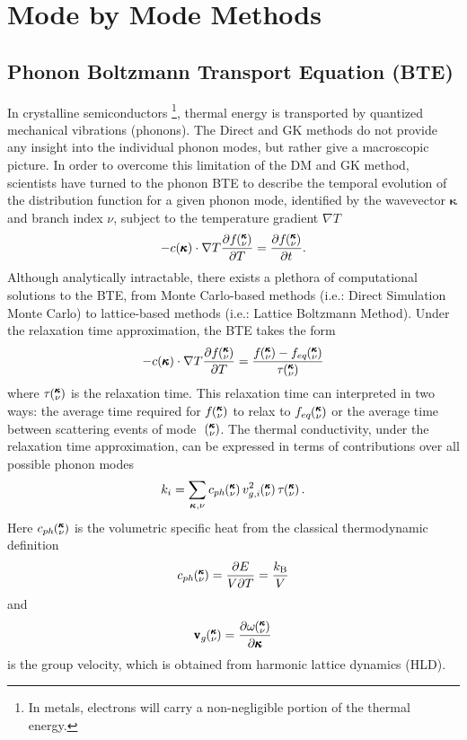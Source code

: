 \section{Mode by Mode Methods}
\subsection{Phonon Boltzmann Transport Equation (BTE)}
%
In crystalline semiconductors \footnote{In metals, electrons will carry a non-negligible portion of the thermal energy.}, thermal energy is transported by quantized mechanical vibrations (phonons). The Direct and GK methods do not provide any insight into the individual phonon modes, but rather give a macroscopic picture. In order to overcome this limitation of the DM and GK method, scientists have turned to the phonon BTE to describe the temporal evolution of the distribution function for a given phonon mode, identified by the wavevector $\pmb{\kappa}$ and branch index $\nu$, subject to the temperature gradient $\nabla T$ \cite{srivastava1990physics} 
%
\begin{equation}\label{EQ:BTE}
-c(\pmb{\kappa})\cdot \nabla T\frac{\partial f\mspace{-4.0mu}\left(\mspace{-8.0mu} \begin{smallmatrix}&\pmb{\kappa} \\&\nu\end{smallmatrix} \mspace{-3.0mu}\right)}{\partial T}=\frac{\partial f\mspace{-4.0mu}\left(\mspace{-8.0mu} \begin{smallmatrix}&\pmb{\kappa} \\&\nu\end{smallmatrix} \mspace{-3.0mu}\right)}{\partial t}.
\end{equation}
%
Although analytically intractable, there exists a plethora of computational solutions to the BTE, from Monte Carlo-based methods (i.e.: Direct Simulation Monte Carlo)\cite{mazumder2001monte} to lattice-based methods (i.e.: Lattice Boltzmann Method)\cite{nabovati2011lattice}. Under the relaxation time approximation, the BTE takes the form
%
\begin{equation}\label{EQ:BTE_lin}
-c(\pmb{\kappa})\cdot \nabla T\frac{\partial f\kv}{\partial T}=\frac{f\kv-f_{eq}\kv}{\tau \kv}
\end{equation}
%
where $\tau \mspace{-4.0mu}\left(\mspace{-8.0mu} \begin{smallmatrix}&\pmb{\kappa} \\&\nu\end{smallmatrix} \mspace{-3.0mu}\right)$ is the relaxation time. This relaxation time can interpreted in two ways: the average time required for $f\mspace{-4.0mu}\left(\mspace{-8.0mu} \begin{smallmatrix}&\pmb{\kappa} \\&\nu\end{smallmatrix} \mspace{-3.0mu}\right)$ to relax to $f_{eq}\mspace{-4.0mu}\left(\mspace{-8.0mu} \begin{smallmatrix}&\pmb{\kappa} \\&\nu\end{smallmatrix} \mspace{-3.0mu}\right)$ or the average time between scattering events of mode ~$\mspace{-4.0mu}\left(\mspace{-8.0mu} \begin{smallmatrix}&\pmb{\kappa} \\&\nu\end{smallmatrix} \mspace{-3.0mu}\right)$. The thermal conductivity, under the relaxation time approximation, can be expressed in terms of contributions over all possible phonon modes \cite{srivastava1990physics}
%
\begin{equation}\label{EQ:k_RTA}
	k_{i}= \sum_{\bm{\kappa},\nu} c_{ph}\kv v^2_{g,i}\kv\tau\kv.
\end{equation}
%
Here $c_{ph}\mspace{-4.0mu}\left(\mspace{-8.0mu} \begin{smallmatrix}&\pmb{\kappa} \\&\nu\end{smallmatrix} \mspace{-3.0mu}\right)$ is the volumetric specific heat from the classical thermodynamic definition \cite{mcgaugheythesis}
%
\begin{equation}\label{EQ:Cph}
c_{ph}\mspace{-4.0mu}\left(\mspace{-8.0mu} \begin{smallmatrix}&\pmb{\kappa} \\&\nu\end{smallmatrix} \mspace{-3.0mu}\right)=\frac{\partial E}{V\partial T}=\frac{k_\mathrm{B}}{V}
\end{equation}
%
and
\begin{equation}\label{EQ:Vg}
\pmb{\mathrm{v}}_{g}\mspace{-4.0mu}\left(\mspace{-8.0mu} \begin{smallmatrix}&\pmb{\kappa} \\&\nu\end{smallmatrix} \mspace{-3.0mu}\right)=\frac{\partial \omega \mspace{-4.0mu}\left(\mspace{-8.0mu} \begin{smallmatrix}&\pmb{\kappa} \\&\nu\end{smallmatrix} \mspace{-3.0mu}\right)}{\partial \pmb{\kappa}}
\end{equation}
is the group velocity, which is obtained from harmonic lattice dynamics (HLD).

